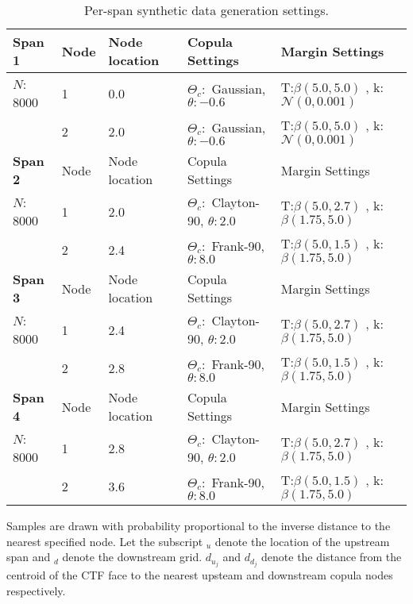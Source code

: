 \begin{table}[h]
    \begin{center}
        \caption{Per-span synthetic data generation settings.}
        \begin{tabular}{|l|l|l|l|l|}
            \hline
            \bf Span 1 & Node & Node location & Copula Settings  & Margin Settings \\
            \hline
            $N$: 8000  & 1  & 0.0 & $\Theta_c:$ Gaussian, $\theta:-0.6$ &  T:$\beta(5.0, 5.0)$ , k: $\mathcal{N}(0, 0.001)$ \\
                   & 2  & 2.0 & $\Theta_c:$ Gaussian, $\theta:-0.6$ &  T:$\beta(5.0, 5.0)$ , k: $\mathcal{N}(0, 0.001)$   \\
            \hline \hline
            \bf Span 2 & Node & Node location & Copula Settings  & Margin Settings \\
            \hline
             $N$: 8000 & 1  & 2.0 & $\Theta_c:$ Clayton-90, $\theta: 2.0$ &  T:$\beta(5.0, 2.7)$ , k: $\beta(1.75, 5.0)$ \\
            & 2  & 2.4 & $\Theta_c:$ Frank-90, $\theta: 8.0$ &  T:$\beta(5.0, 1.5)$ , k: $\beta(1.75, 5.0)$   \\
            \hline \hline
            \bf Span 3 & Node & Node location & Copula Settings  & Margin Settings \\
            \hline
             $N$: 8000 & 1  & 2.4 & $\Theta_c:$ Clayton-90, $\theta: 2.0$ &  T:$\beta(5.0, 2.7)$ , k: $\beta(1.75, 5.0)$ \\
            & 2  & 2.8 & $\Theta_c:$ Frank-90, $\theta: 8.0$ &  T:$\beta(5.0, 1.5)$ , k: $\beta(1.75, 5.0)$   \\
            \hline \hline
            \bf Span 4 & Node & Node location & Copula Settings  & Margin Settings \\
            \hline
            $N$: 8000 & 1  & 2.8 & $\Theta_c:$ Clayton-90, $\theta: 2.0$ &  T:$\beta(5.0, 2.7)$ , k: $\beta(1.75, 5.0)$ \\
            & 2  & 3.6 & $\Theta_c:$ Frank-90, $\theta: 8.0$ &  T:$\beta(5.0, 1.5)$ , k: $\beta(1.75, 5.0)$   \\
            \hline
        \end{tabular}
        \label{tab:synth_settings}
    \end{center}
\end{table}

Samples are drawn with probability proportional to the inverse distance to the nearest specified node.
Let the subscript $_u$ denote the location of the upstream span and $_d$ denote the downstream grid. $d_{u_j}$ and  $d_{d_j}$ denote the distance from the centroid of the CTF face to the nearest upsteam and downstream copula nodes respectively.

